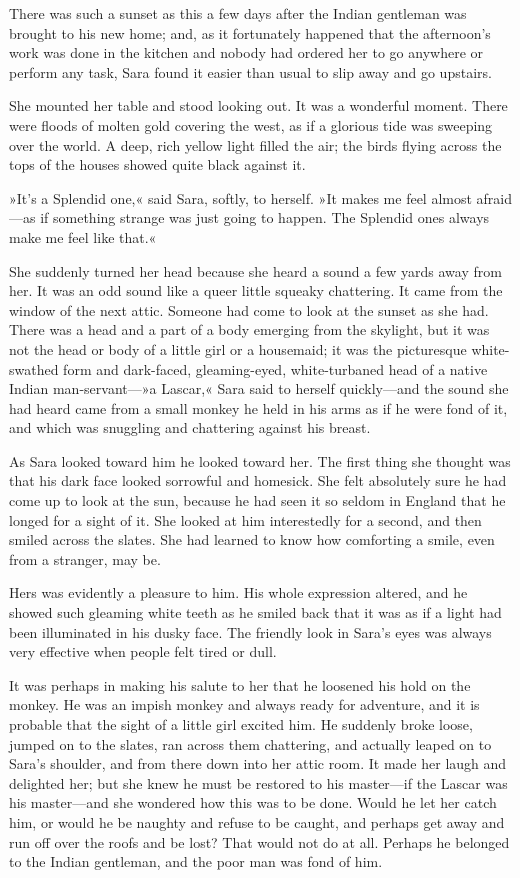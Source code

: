 There was such a sunset as this a few days after the Indian gentleman was brought to his new home; and, as it fortunately happened that the afternoon's work was done in the kitchen and nobody had ordered her to go anywhere or perform any task, Sara found it easier than usual to slip away and go upstairs.

She mounted her table and stood looking out. It was a wonderful moment. There were floods of molten gold covering the west, as if a glorious tide was sweeping over the world. A deep, rich yellow light filled the air; the birds flying across the tops of the houses showed quite black against it.

»It's a Splendid one,« said Sara, softly, to herself. »It makes me feel almost afraid—as if something strange was just going to happen. The Splendid ones always make me feel like that.«

She suddenly turned her head because she heard a sound a few yards away from her. It was an odd sound like a queer little squeaky chattering. It came from the window of the next attic. Someone had come to look at the sunset as she had. There was a head and a part of a body emerging from the skylight, but it was not the head or body of a little girl or a housemaid; it was the picturesque white-swathed form and dark-faced, gleaming-eyed, white-turbaned head of a native Indian man-servant—»a Lascar,« Sara said to herself quickly—and the sound she had heard came from a small monkey he held in his arms as if he were fond of it, and which was snuggling and chattering against his breast.

As Sara looked toward him he looked toward her. The first thing she thought was that his dark face looked sorrowful and homesick. She felt absolutely sure he had come up to look at the sun, because he had seen it so seldom in England that he longed for a sight of it. She looked at him interestedly for a second, and then smiled across the slates. She had learned to know how comforting a smile, even from a stranger, may be.

Hers was evidently a pleasure to him. His whole expression altered, and he showed such gleaming white teeth as he smiled back that it was as if a light had been illuminated in his dusky face. The friendly look in Sara's eyes was always very effective when people felt tired or dull.

It was perhaps in making his salute to her that he loosened his hold on the monkey. He was an impish monkey and always ready for adventure, and it is probable that the sight of a little girl excited him. He suddenly broke loose, jumped on to the slates, ran across them chattering, and actually leaped on to Sara's shoulder, and from there down into her attic room. It made her laugh and delighted her; but she knew he must be restored to his master—if the Lascar was his master—and she wondered how this was to be done. Would he let her catch him, or would he be naughty and refuse to be caught, and perhaps get away and run off over the roofs and be lost? That would not do at all. Perhaps he belonged to the Indian gentleman, and the poor man was fond of him.


